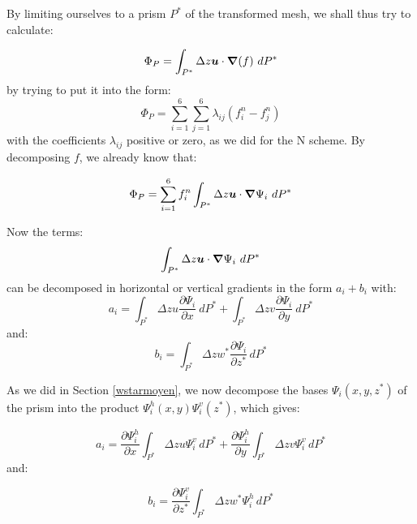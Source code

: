 By limiting ourselves to a prism $P^{\ast}$ of the transformed mesh, we shall
thus try to calculate:%

\begin{equation}
\Phi_{P}=\int\nolimits_{P^{\ast}}\Delta z\bm{u}\cdot\bm{\nabla}(f)~dP^{\ast}
\end{equation}
by trying to put it into the form:
\begin{equation}
\Phi_{P}=\sum\limits_{i=1}^{6}\sum\limits_{j=1}^{6}\lambda_{ij}(f_{i}^{n}-f_{j}^{n})
\end{equation}
with the coefficients $\lambda_{ij}$ positive or zero, as we did for the N
scheme. By decomposing $f$, we already know that:

\begin{equation}
\Phi_{P}=\sum\limits_{i=1}^{6}f_{i}^{n}\int\nolimits_{P^{\ast}}\Delta
z\vec{u}\cdot\Grad\Psi_{i}~dP^{\ast}%
\end{equation}

Now the terms:%
\begin{equation}
\int\nolimits_{P^{\ast}}\Delta z\vec{u}\cdot\Grad\Psi_{i}~dP^{\ast}%
\end{equation}
can be decomposed in horizontal or vertical gradients in the form $a_{i}%
+b_{i}$ with:
\begin{equation}
a_{i}=\int\nolimits_{P^{\ast}}\Delta z u\dfrac{\partial\Psi_{i}}{\partial
x}~dP^{\ast}+\int\nolimits_{P^{\ast}}\Delta z v\dfrac{\partial\Psi_{i}%
}{\partial y}~dP^{\ast}%
\end{equation}
and:%
\begin{equation}
b_{i}=\int\nolimits_{P^{\ast}}\Delta zw^{\ast}\dfrac{\partial\Psi_{i}}{\partial
z^{\ast}}\,dP^{\ast}%
\end{equation}

As we did in Section \ref{wstarmoyen}, we now decompose the bases $\Psi
_{i}(x,y,z^{\ast})$ of the prism into the product $\Psi_{i}^{h}(x,y)\Psi
_{i}^{v}(z^{\ast})$, which gives:%

\begin{equation}
a_{i}=\dfrac{\partial\Psi_{i}^{h}}{\partial x}\int\nolimits_{P^{\ast}}\Delta
z u\Psi_{i}^{v}\,dP^{\ast}+\dfrac{\partial\Psi_{i}^{h}}{\partial y}%
\int\nolimits_{P^{\ast}}\Delta z v\Psi_{i}^{v}\,dP^{\ast}%
\end{equation}
and:%

\begin{equation}
b_{i}=\dfrac{\partial\Psi_{i}^{v}}{\partial z^{\ast}}\int\nolimits_{P^{\ast}%
}\Delta zw^{\ast}\Psi_{i}^{h}\,dP^{\ast}%
\end{equation}

